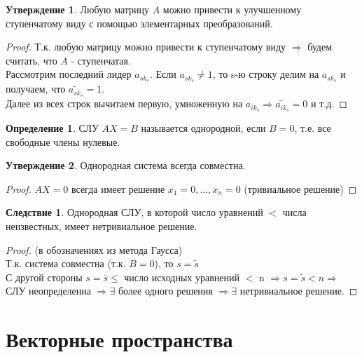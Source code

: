 \documentclass[a4paper, 12pt]{article}
\theoremstyle{definition}
\newtheorem*{definition}{Определение}
\newtheorem*{consequense}{Следствие}
\newtheorem*{subtheorem}{Утверждение}
\begin{document}
  \begin{subtheorem}
    Любую матрицу $A$  можно привести к улучшенному ступенчатому виду с помощью элементарных преобразований.
  \end{subtheorem} 
  \begin{proof}
    Т.к. любую матрицу можно привести к ступенчатому виду $\Longrightarrow$ будем считать, что $A$ - ступенчатая. \\
    Рассмотрим последний лидер $a_{sk_s}$. Если $a_{sk_s} \neq 1$, то s-ю строку делим на $a_{sk_s}$ и получаем, что $\widetilde{a_{sk_s}}=1$. \\ Далее из всех строк вычитаем первую, умноженную на $a_{ik_s} \Longrightarrow \widetilde{a_{ik_s}}  =0$ и т.д. 
  \end{proof} 

  \begin{definition}
    СЛУ $AX=B$ называется однородной, если $B=0$, т.е. все свободные члены нулевые.  
  \end{definition} 
  \begin{subtheorem}
    Однородная система всегда совместна.
  \end{subtheorem} 
  \begin{proof}
    $AX=0$ всегда имеет решение $x_1=0,...,x_n=0$ (тривиальное решение)
  \end{proof} 
  \begin{consequense}
    Однородная СЛУ, в которой число уравнений $<$ числа неизвестных, имеет нетривиальное решение.  
  \end{consequense} 
  \begin{proof}
    (в обозначениях из метода Гаусса)\\
    Т.к. система совместна (т.к. $B=0$), то $s=\widetilde{s}$ \\
    С другой стороны $s=\overline{s} \leq$ число исходных уравнений $<$ n $\Longrightarrow s=\widetilde{s} < n \Longrightarrow$ СЛУ неопределенна $\Longrightarrow \exists$ более одного решения $\Longrightarrow \exists$ нетривиальное решение.     
  \end{proof} 

  \newpage
  \section{Векторные пространства}
\end{document}
